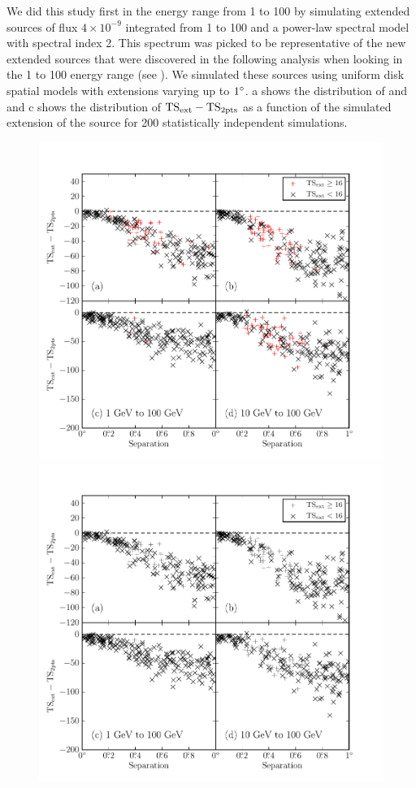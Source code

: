 We did this study first in the energy range from 1 \gev to 100 \gev by
simulating extended sources of flux $4\times10^{-9}$ \fluxunits integrated
from 1 \gev to 100 \gev and a power-law spectral model with
spectral index 2.  This spectrum was picked to be representative of the
new extended sources that were discovered in the following analysis
when looking in the 1 \gev to 100 \gev energy range
(see ).
We simulated these sources using uniform disk spatial models
with extensions varying
up to $1^\circ$.  
a shows the distribution
of \tsext and \tsinc and 
c shows 
the distribution of $\mathrm{TS}_\mathrm{ext}-\mathrm{TS}_{\mathrm{2pts}}$ as a
function of the simulated extension of the source
for 200 statistically independent simulations.


\begin{figure}[htbp]
    \ifcolorfigure
    \includegraphics{mc_plots/confusion_2pts_plot_color.pdf}
    \else
    \includegraphics{mc_plots/confusion_2pts_plot_bw.pdf}

\end{figure}
